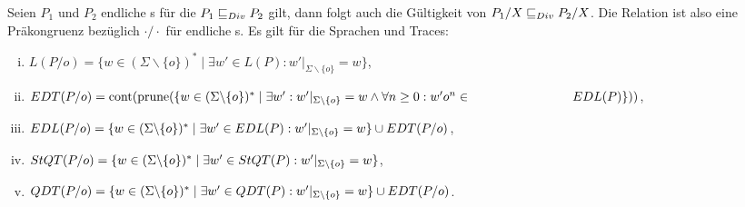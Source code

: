 \begin{Satz}
  \label{DivHidingSatz}
  Seien $P_1$ und $P_2$ endliche \MEIO{}s für die $P_1 \sqsubseteq  _{Div} P_2$ gilt, dann
  folgt auch die Gültigkeit von $P_1/X \sqsubseteq  _{Div} P_2/X$. Die Relation \DRel{} ist
  also eine Präkongruenz bezüglich $\cdot /\cdot$ für endliche \MEIO{}s. Es
  gilt für die Sprachen und Traces:
  \begin{enumerate}[(i)]
    \item $L(P/o) = \{w\in (\Sigma\backslash \{o\})^*\mid \exists w'\in L(P):
      w'|_{\Sigma\backslash \{o\}} = w\}$,
    \item $EDT (P/o) = \mathrm{cont} (\mathrm{prune} (\{w\in (\Sigma\backslash \{o\})^*\mid
      \exists w':w'|_{\Sigma\backslash \{o\}} = w\land \forall n\geq 0:
      w'o^n\in\hspace*{2.8cm}EDL (P)\}))$,
    \item $EDL (P/o) = \{w\in (\Sigma\backslash \{o\})^*\mid \exists w'\in
      EDL(P): w'|_{\Sigma\backslash \{o\}} = w\} \cup EDT (P/o)$,
    \item $StQT (P/o) = \{w\in (\Sigma\backslash \{o\})^*\mid \exists w'\in
      StQT(P): w'|_{\Sigma\backslash \{o\}} = w\}$,
    \item $QDT (P/o) = \{w\in (\Sigma\backslash \{o\})^*\mid \exists w'\in
      QDT(P): w'|_{\Sigma\backslash \{o\}} = w\} \cup EDT (P/o)$.
  \end{enumerate}
\end{Satz}
